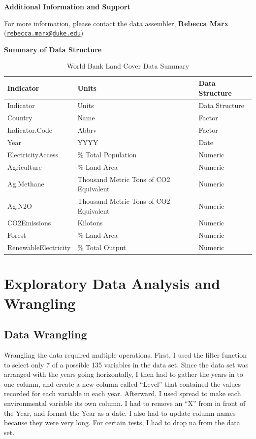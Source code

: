 \documentclass[12pt,]{article}
\begin{document}
\textbf{Additional Information and Support}

For more information, please contact the data assembler, \textbf{Rebecca
Marx}
(\href{mailto:rebecca.marx@duke.edu}{\nolinkurl{rebecca.marx@duke.edu}})

\textbf{Summary of Data Structure}

\begin{longtable}[]{@{}lll@{}}
\caption{\label{tab:table} World Bank Land Cover Data
Summary}\tabularnewline
\toprule
Indicator & Units & Data Structure\tabularnewline
\midrule
\endfirsthead
\toprule
Indicator & Units & Data Structure\tabularnewline
\midrule
\endhead
Country & Name & Factor\tabularnewline
Indicator.Code & Abbrv & Factor\tabularnewline
Year & YYYY & Date\tabularnewline
ElectricityAccess & \% Total Population & Numeric\tabularnewline
Agriculture & \% Land Area & Numeric\tabularnewline
Ag.Methane & Thousand Metric Tons of CO2 Equivalent &
Numeric\tabularnewline
Ag.N2O & Thousand Metric Tons of CO2 Equivalent & Numeric\tabularnewline
CO2Emissions & Kilotons & Numeric\tabularnewline
Forest & \% Land Area & Numeric\tabularnewline
RenewableElectricity & \% Total Output & Numeric\tabularnewline
\bottomrule
\end{longtable}

\newpage

\section{Exploratory Data Analysis and
Wrangling}\label{exploratory-data-analysis-and-wrangling}

\subsection{Data Wrangling}\label{data-wrangling}

Wrangling the data required multiple operations. First, I used the
filter function to select only 7 of a possible 135 variables in the data
set. Since the data set was arranged with the years going horizontally,
I then had to gather the years in to one column, and create a new column
called ``Level'' that contained the values recorded for each variable in
each year. Afterward, I used spread to make each environmental variable
its own column. I had to remove an ``X'' from in front of the Year, and
format the Year as a date. I also had to update column names because
they were very long. For certain tests, I had to drop na from the data
set.
\end{document}

